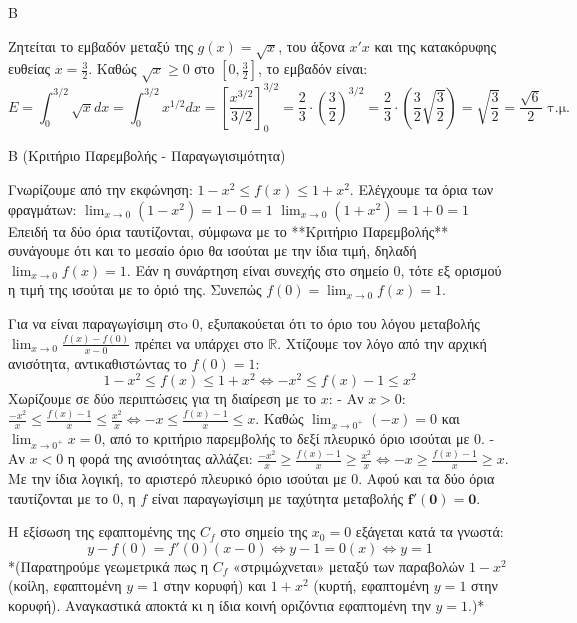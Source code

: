 \begin{thema}{Β}
\begin{erwthma}
\item Ζητείται το εμβαδόν μεταξύ της $g(x) = \sqrt{x}$, του άξονα $x'x$ και της κατακόρυφης ευθείας $x = \frac{3}{2}$.
Καθώς $\sqrt{x} \ge 0$ στο $\left[0, \frac{3}{2}\right]$, το εμβαδόν είναι:
\[ E = \int_0^{3/2} \sqrt{x} dx = \int_0^{3/2} x^{1/2} dx = \left[ \frac{x^{3/2}}{3/2} \right]_0^{3/2} = \frac{2}{3} \cdot \left( \frac{3}{2} \right)^{3/2} = \frac{2}{3} \cdot \left(\frac{3}{2} \sqrt{\frac{3}{2}}\right) = \sqrt{\frac{3}{2}} = \frac{\sqrt{6}}{2} \text{ τ.μ.} \]
\end{erwthma}
\end{thema}

\begin{thema}{Β}
(Κριτήριο Παρεμβολής - Παραγωγισιμότητα)
\begin{erwthma}
\item Γνωρίζουμε από την εκφώνηση: $1 - x^2 \le f(x) \le 1 + x^2$.
Ελέγχουμε τα όρια των φραγμάτων:
$\lim_{x\to 0}(1 - x^2) = 1 - 0 = 1$
$\lim_{x\to 0}(1 + x^2) = 1 + 0 = 1$
Επειδή τα δύο όρια ταυτίζονται, σύμφωνα με το **Κριτήριο Παρεμβολής** συνάγουμε ότι και το μεσαίο όριο θα ισούται με την ίδια τιμή, δηλαδή $\lim_{x\to 0} f(x) = 1$.
Εάν η συνάρτηση είναι συνεχής στο σημείο 0, τότε εξ ορισμού η τιμή της ισούται με το όριό της. Συνεπώς $f(0) = \lim_{x\to0} f(x) = 1$.

\item Για να είναι παραγωγίσιμη στo $0$, εξυπακούεται ότι το όριο του λόγου μεταβολής $\lim_{x\to 0} \frac{f(x)-f(0)}{x-0}$ πρέπει να υπάρχει στο $\mathbb{R}$.
Χτίζουμε τον λόγο από την αρχική ανισότητα, αντικαθιστώντας το $f(0)=1$:
\[ 1 - x^2 \le f(x) \le 1 + x^2 \Leftrightarrow -x^2 \le f(x) - 1 \le x^2 \]
Χωρίζουμε σε δύο περιπτώσεις για τη διαίρεση με το $x$:
- Αν $x > 0$: $\frac{-x^2}{x} \le \frac{f(x)-1}{x} \le \frac{x^2}{x} \Leftrightarrow -x \le \frac{f(x)-1}{x} \le x$.
Καθώς $\lim_{x\to 0^+}(-x) = 0$ και $\lim_{x\to 0^+} x = 0$, από το κριτήριο παρεμβολής το δεξί πλευρικό όριο ισούται με $0$.
- Αν $x < 0$ η φορά της ανισότητας αλλάζει: $\frac{-x^2}{x} \ge \frac{f(x)-1}{x} \ge \frac{x^2}{x} \Leftrightarrow -x \ge \frac{f(x)-1}{x} \ge x$.
Με την ίδια λογική, το αριστερό πλευρικό όριο ισούται με $0$.
Αφού και τα δύο όρια ταυτίζονται με το $0$, η $f$ είναι παραγωγίσιμη με ταχύτητα μεταβολής $\mathbf{f'(0) = 0}$.

\item Η εξίσωση της εφαπτομένης της $C_f$ στο σημείο της $x_0=0$ εξάγεται κατά τα γνωστά:
\[ y - f(0) = f'(0)(x - 0) \Leftrightarrow y - 1 = 0(x) \Leftrightarrow y = 1 \]
*(Παρατηρούμε γεωμετρικά πως η $C_f$ «στριμώχνεται» μεταξύ των παραβολών $1-x^2$ (κοίλη, εφαπτομένη $y=1$ στην κορυφή) και $1+x^2$ (κυρτή, εφαπτομένη $y=1$ στην κορυφή). Αναγκαστικά αποκτά κι η ίδια κοινή οριζόντια εφαπτομένη την $y=1$.)*


\end{erwthma}
\end{thema}

